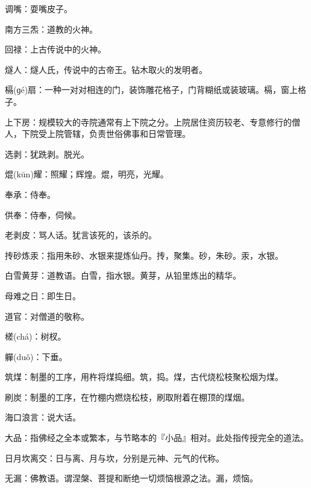 \startbuffer[664]
调嘴：耍嘴皮子。
\stopbuffer


\startbuffer[665]
南方三炁：道教的火神。
\stopbuffer


\startbuffer[666]
回禄：上古传说中的火神。
\stopbuffer


\startbuffer[667]
燧人：燧人氏，传说中的古帝王。钻木取火的发明者。
\stopbuffer


\startbuffer[668]
槅(ɡé)扇：一种一对对相连的门，装饰雕花格子，门背糊纸或装玻璃。槅，窗上格子。
\stopbuffer


\startbuffer[669]
上下房：规模较大的寺院通常有上下院之分。上院居住资历较老、专意修行的僧人，下院受上院管辖，负责世俗佛事和日常管理。
\stopbuffer


\startbuffer[670]
选剥：犹跣剥。脱光。
\stopbuffer


\startbuffer[671]
焜(kūn)耀：照耀；辉煌。焜，明亮，光耀。
\stopbuffer


\startbuffer[672]
奉承：侍奉。
\stopbuffer


\startbuffer[673]
供奉：侍奉，伺候。
\stopbuffer


\startbuffer[674]
老剥皮：骂人话。犹言该死的，该杀的。
\stopbuffer


\startbuffer[675]
抟砂炼汞：指用朱砂、水银来提炼仙丹。抟，聚集。砂，朱砂。汞，水银。
\stopbuffer


\startbuffer[676]
白雪黄芽：道教语。白雪，指水银。黄芽，从铅里炼出的精华。
\stopbuffer


\startbuffer[677]
母难之日：即生日。
\stopbuffer


\startbuffer[678]
道官：对僧道的敬称。
\stopbuffer


\startbuffer[679]
槎(chá)：树杈。
\stopbuffer


\startbuffer[680]
軃(duǒ)：下垂。
\stopbuffer


\startbuffer[681]
筑煤：制墨的工序，用杵将煤捣细。筑，捣。煤，古代烧松枝聚松烟为煤。
\stopbuffer


\startbuffer[682]
刷炭：制墨的工序，在竹棚内燃烧松枝，刷取附着在棚顶的煤烟。
\stopbuffer


\startbuffer[683]
海口浪言：说大话。
\stopbuffer


\startbuffer[684]
大品：指佛经之全本或繁本，与节略本的『小品』相对。此处指传授完全的道法。
\stopbuffer


\startbuffer[685]
日月坎离交：日与离、月与坎，分别是元神、元气的代称。
\stopbuffer


\startbuffer[686]
无漏：佛教语。谓涅槃、菩提和断绝一切烦恼根源之法。漏，烦恼。
\stopbuffer


